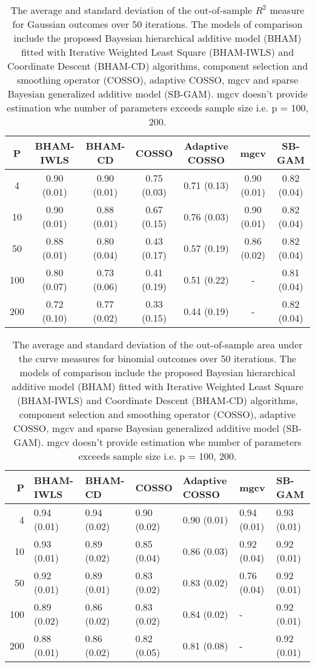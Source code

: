 \documentclass[AMA,STIX1COL,]{WileyNJD-v2}
\begin{document}
\clearpage

\begin{table}[ht]
\centering
\begin{tabular}{ccccccc}
  \hline
P & BHAM-IWLS & BHAM-CD & COSSO & Adaptive COSSO & mgcv & SB-GAM \\ 
  \hline
  4 & 0.90 (0.01) & 0.90 (0.01) & 0.75 (0.03) & 0.71 (0.13) & 0.90 (0.01) & 0.82 (0.04) \\ 
   10 & 0.90 (0.01) & 0.88 (0.01) & 0.67 (0.15) & 0.76 (0.03) & 0.90 (0.01) & 0.82 (0.04) \\ 
   50 & 0.88 (0.01) & 0.80 (0.04) & 0.43 (0.17) & 0.57 (0.19) & 0.86 (0.02) & 0.82 (0.04) \\ 
  100 & 0.80 (0.07) & 0.73 (0.06) & 0.41 (0.19) & 0.51 (0.22) & - & 0.81 (0.04) \\ 
  200 & 0.72 (0.10) & 0.77 (0.02) & 0.33 (0.15) & 0.44 (0.19) & - & 0.82 (0.04) \\ 
   \hline
\end{tabular}
\caption{The average and standard deviation of the out-of-sample $R^2$ measure for Gaussian outcomes over 50 iterations. The models of comparison include the proposed Bayesian hierarchical additive model (BHAM) fitted with Iterative Weighted Least Square (BHAM-IWLS) and Coordinate Descent (BHAM-CD) algorithms, component selection and smoothing operator (COSSO), adaptive COSSO, mgcv and sparse Bayesian generalized additive model (SB-GAM). mgcv doesn't provide estimation whe number of parameters exceeds sample size i.e. p = 100, 200.} 
\label{tab:gaus}
\end{table}
\clearpage

\begin{table}[ht]
\centering
\begin{tabular}{rllllll}
  \hline
P & BHAM-IWLS & BHAM-CD & COSSO & Adaptive COSSO & mgcv & SB-GAM \\ 
  \hline
  4 & 0.94 (0.01) & 0.94 (0.02) & 0.90 (0.02) & 0.90 (0.01) & 0.94 (0.01) & 0.93 (0.01) \\ 
   10 & 0.93 (0.01) & 0.89 (0.02) & 0.85 (0.04) & 0.86 (0.03) & 0.92 (0.04) & 0.92 (0.01) \\ 
   50 & 0.92 (0.01) & 0.89 (0.01) & 0.83 (0.02) & 0.83 (0.02) & 0.76 (0.04) & 0.92 (0.01) \\ 
  100 & 0.89 (0.02) & 0.86 (0.02) & 0.83 (0.02) & 0.84 (0.02) & - & 0.92 (0.01) \\ 
  200 & 0.88 (0.01) & 0.86 (0.02) & 0.82 (0.05) & 0.81 (0.08) & - & 0.92 (0.01) \\ 
   \hline
\end{tabular}
\caption{The average and standard deviation of the out-of-sample area under the curve measures for binomial outcomes over 50 iterations. The models of comparison include the proposed Bayesian hierarchical additive model (BHAM) fitted with Iterative Weighted Least Square (BHAM-IWLS) and Coordinate Descent (BHAM-CD) algorithms, component selection and smoothing operator (COSSO), adaptive COSSO, mgcv and sparse Bayesian generalized additive model (SB-GAM). mgcv doesn't provide estimation whe number of parameters exceeds sample size i.e. p = 100, 200.} 
\label{tab:bin_auc}
\end{table}
\end{document}
